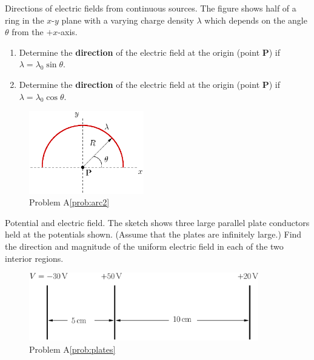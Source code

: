 \begin{aproblem}{Directions of electric fields from continuous sources.}
  The figure shows half of a ring in the $x$-$y$ plane with a varying
  charge density $\lambda$ which depends on the angle $\theta$ from
  the $+x$-axis.
  \begin{enumerate}
  \item Determine the {\bf direction} of the electric field at the
    origin (point {\bf P}) if $\lambda = \lambda_0 \sin{\theta}$.
  \item Determine the {\bf direction} of the electric field at the
    origin (point {\bf P}) if $\lambda = \lambda_0 \cos{\theta}$.
  \end{enumerate}
  \label{prob:arc2}
  \begin{figure}[h]
    \begin{center}
      \includegraphics[width=5cm]{additional_problems/arc2}
      \caption{Problem A\ref{prob:arc2}}
    \end{center}
  \end{figure}
\end{aproblem}

\newpage

\begin{aproblem}{Potential and electric field.} 
  The sketch shows three large parallel plate conductors held at the
  potentials shown. (Assume that the plates are infinitely large.)
  Find the direction and magnitude of the uniform electric field in
  each of the two interior regions. \label{prob:plates}
  \begin{figure}[h]
    \begin{center}
      \includegraphics[width=10cm]{additional_problems/plates}
      \caption{Problem A\ref{prob:plates}}
    \end{center}
  \end{figure}
\end{aproblem}


